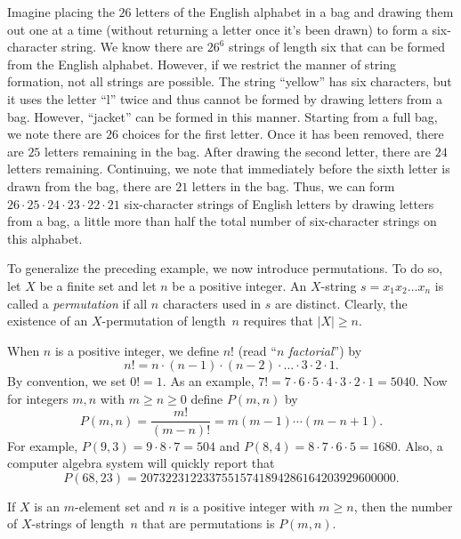 \begin{example}\label{exa:strings:perm}
  Imagine placing the $26$ letters of the English alphabet in a bag
  and drawing them out one at a time (without returning a letter once
  it's been drawn) to form a six-character string. We know there are
  $26^6$ strings of length six that can be formed from the English
  alphabet. However, if we restrict the manner of string formation,
  not all strings are possible. The string ``yellow'' has six
  characters, but it uses the letter ``l'' twice and thus cannot be
  formed by drawing letters from a bag. However, ``jacket'' can be
  formed in this manner. Starting from a full bag, we note there are
  $26$ choices for the first letter. Once it has been removed, there
  are $25$ letters remaining in the bag. After drawing the second
  letter, there are $24$ letters remaining. Continuing, we note that
  immediately before the sixth letter is drawn from the bag, there are
  $21$ letters in the bag. Thus, we can form $26\cdot 25\cdot 24\cdot
  23\cdot 22\cdot 21$ six-character strings of English letters by
  drawing letters from a bag, a little more than half the total number
  of six-character strings on this alphabet.
\end{example}

To generalize the preceding example, we now introduce permutations. To
do so, let $X$ be a finite set and let $n$ be a positive integer.  An
$X$-string $s=x_1x_2\dots x_n$ is called a \textit{permutation} if all
$n$ characters used in $s$ are distinct.  Clearly, the existence of an
$X$-permutation of length~$n$ requires that $|X|\ge n$.

When $n$ is a positive integer, we define $n!$ (read ``$n$
\textit{factorial}'') by
\[
n! = n\cdot (n-1)\cdot (n-2)\cdot \ldots\cdot 3\cdot 2\cdot 1. 
\]
By convention, we set $0!=1$. As an example, $7!=7\cdot 6\cdot 5\cdot
4\cdot 3\cdot 2 \cdot 1=5040$.  Now for integers $m,n$ with $m\ge
n\ge0$ define $P(m,n)$ by
\[
P(m,n) = \frac{m!}{(m-n)!} = m(m-1)\cdots(m-n+1).
\]
For example, $P(9,3)=9\cdot 8\cdot 7=504$ and $P(8,4)=8\cdot 7\cdot
6\cdot5 =1680$.  Also, a computer algebra system will quickly report
that
\[
P(68,23) = 20732231223375515741894286164203929600000.
\]

\begin{proposition}\label{prop:strings:permutations}
If $X$ is an $m$-element set and $n$ is a positive integer with $m\ge n$,
then the number of $X$-strings of length~$n$ that are permutations
is $P(m,n)$.
\end{proposition}

